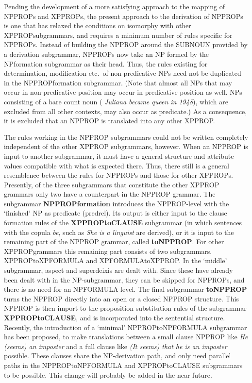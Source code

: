 Pending the development of a more satisfying approach to the mapping of 
NPPROPs and XPPROPs,  the present approach to the derivation of 
NPPROPs is one that has relaxed the conditions on isomorphy with other 
XPPROPsubgrammars, and requires a minimum number of rules specific for 
NPPROPs. Instead of building the NPPROP around the SUBNOUN provided by a 
derivation subgrammar, NPPROPs now take an NP formed by the NPformation 
subgrammar as their head. Thus, the rules existing for determination, 
modification etc.\ of 
non-predicative NPs need not be duplicated in the NPPROPformation subgrammar.
(Note that almost all NPs that may occur 
in non-predicative position may occur in predicative position as well. 
NPs consisting of a bare count noun ({\em 
Juliana  became queen in 1948}), which are excluded from all other contexts, may
also occur as predicate.) 
As a consequence, it is excluded that an NPPROP is translated into 
any other XPPROP. 

The rules working in the NPPROP subgrammars could not be written completely 
independent of the other XPPROP subgrammars, however. When an NPPROP is input 
to another subgrammar, it must have a general structure and attribute values 
compatible with what is expected there. Thus, there still is a general 
resemblence between the rules for NPPROPs and those for other XPPROPs.
Presently, of the three subgrammars that constitute the other XPPROP grammars 
only two have a counterpart in the NPPROP grammar.
The subgrammar {\bf NPPROPformation} introduces the NPPROP-level with the 
`finished' NP as predicate (predrel). 
Its output is either input to the clause formation rules of the 
{\bf XPPROPtoCLAUSE} subgrammar 
(in which sentences with the copula {\em be\/}, 
such as {\em She is a linguist\/} are derived), or 
it is input to the remaining part of the NPPROP grammar, called {\bf toNPPROP}.
For other XPPROPgrammars this remaining part consists of two subgrammars, 
XPPROPtoXPFORMULA and XPFORMULAtoXPPROP. In the `middle' subgrammar, aspect and 
superdeixis are dealt with. Since these have already been dealt with in the 
NP-subgrammar, they can be skipped for NPPROPs, and there is no need for an 
NPFORMULA 
level. The final subgrammar {\bf toNPPROP} turns the NPPROP directly into 
an open or a closed NPPROP structure.
This NPPROP is then import to the proposition substitution rules of
the subgrammar {\bf XPPROPtoCLAUSE}, and is incorporated into the sentential 
structure. Recently, the introduction of a `minimal' NPPROPtoNPFORMULA 
subgrammar has been proposed, to make translations between a small clause 
NPPROP like {\em He (seems) an imposter\/} and a full clause like {\em (It 
seems) that he is an imposter\/} possible. These clauses share the 
NP-derivation 
path, and only need parallel paths in the NPPROPtoNPFORMULA and XPPROPtoCLAUSE 
subgrammars to be possible. This change will probably be added in the near 
future.


